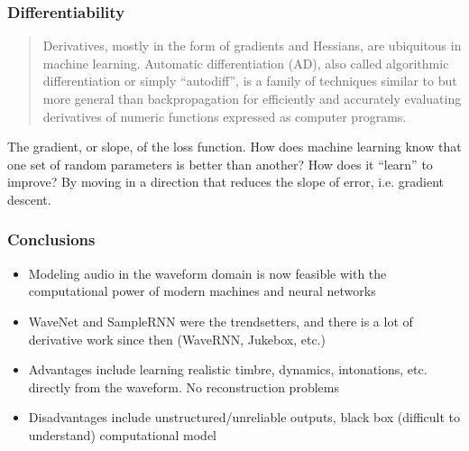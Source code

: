\documentclass{beamer}
\begin{document}

\begin{frame}
	\frametitle{Differentiability}
	\begin{quote}
		Derivatives, mostly in the form of gradients and Hessians, are ubiquitous in machine learning. Automatic differentiation (AD), also called algorithmic differentiation or simply ``autodiff'', is a family of techniques similar to but more general than backpropagation for efficiently and accurately evaluating derivatives of numeric functions expressed as computer programs.
	\end{quote}
	The gradient, or slope, of the loss function. How does machine learning know that one set of random parameters is better than another? How does it ``learn'' to improve? By moving in a direction that reduces the slope of error, i.e. gradient descent.
\end{frame}


\begin{frame}
	\frametitle{Conclusions}
	\begin{itemize}
		\item
			Modeling audio in the waveform domain is now feasible with the computational power of modern machines and neural networks
		\item
			WaveNet and SampleRNN were the trendsetters, and there is a lot of derivative work since then (WaveRNN, Jukebox, etc.)
		\item
			Advantages include learning realistic timbre, dynamics, intonations, etc. directly from the waveform. No reconstruction problems
		\item
			Disadvantages include unstructured/unreliable outputs, black box (difficult to understand) computational model
	\end{itemize}
\end{frame}

\end{document}
